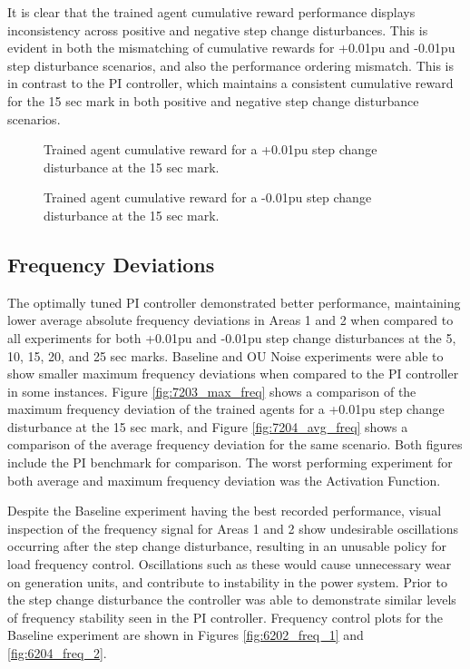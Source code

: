 It is clear that the trained agent cumulative reward performance displays inconsistency across positive and negative step change disturbances. This is evident in both the mismatching of cumulative rewards for +0.01pu and -0.01pu step disturbance scenarios, and also the performance ordering mismatch. This is in contrast to the PI controller, which maintains a consistent cumulative reward for the 15 sec mark in both positive and negative step change disturbance scenarios.
\begin{figure}[h]
	\begin{minipage}[t]{0.50\textwidth}
		\centering
		\resizebox{7cm}{!}{}
		\caption{Trained agent cumulative reward for a +0.01pu step change disturbance at the 15 sec mark.}\label{fig:7201_cum_reward_pos}
	\end{minipage}
	\hspace{0.25cm}
	\begin{minipage}[t]{0.50\textwidth}
		\resizebox{7cm}{!}{}
		\caption{Trained agent cumulative reward for a -0.01pu step change disturbance at the 15 sec mark.}\label{fig:7202_cum_reward_neg}
	\end{minipage}
\end{figure}

\subsection{Frequency Deviations}
The optimally tuned PI controller demonstrated better performance, maintaining lower average absolute frequency deviations in Areas 1 and 2 when compared to all experiments for both +0.01pu and -0.01pu step change disturbances at the 5, 10, 15, 20, and 25 sec marks. Baseline and OU Noise experiments were able to show smaller maximum frequency deviations when compared to the PI controller in some instances. Figure \ref{fig:7203_max_freq} shows a comparison of the maximum frequency deviation of  the trained agents for a +0.01pu step change disturbance at the 15 sec mark, and Figure \ref{fig:7204_avg_freq} shows a comparison of the average frequency deviation for the same scenario. Both figures include the PI benchmark for comparison. The worst performing experiment for both average and maximum frequency deviation was the Activation Function.

Despite the Baseline experiment having the best recorded performance, visual inspection of the frequency signal for Areas 1 and 2 show undesirable oscillations occurring after the step change disturbance, resulting in an unusable policy for load frequency control. Oscillations such as these would cause unnecessary wear on generation units, and contribute to instability in the power system. Prior to the step change disturbance the controller was able to demonstrate similar levels of frequency stability seen in the PI controller. Frequency control plots for the Baseline experiment are shown in Figures \ref{fig:6202_freq_1} and \ref{fig:6204_freq_2}.

